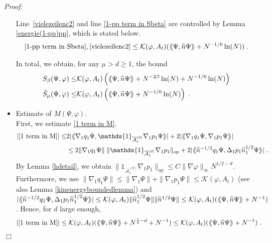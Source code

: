 \documentclass[11pt, english, american]{article}
\newcommand{\laa}{\langle\hspace{-0.08cm}\langle}
\newcommand{\raa}{\rangle\hspace{-0.08cm}\rangle}
\newenvironment{proof}{\emph{Proof:}}{\begin{flushright} $ \Box $ \end{flushright}}
\renewcommand{\phi}{\varphi}
\begin{document}
\begin{proof}
\begin{itemize}
Line~\eqref{vielezeilenc2} and line \eqref{1-pp term in Sbeta} are controlled by Lemma \ref{energie(1-pp)pp}, which is stated below.
\begin{align*}
\eqref{1-pp term in Sbeta},
\eqref{vielezeilenc2}
\leq
\mathcal{K}(\phi,A_t)( \laa \Psi, \widehat{n} \Psi \raa + N^{-1/6} \ln(N) )
\;.
\end{align*}

In total, we obtain, for any $\mu> d \geq 1$, the bound 
\begin{align*}
S_\beta (\Psi,\phi)
\leq &
\mathcal{K}(\phi,A_t) \left(\laa\Psi,\widehat{n}\Psi\raa+N^{-2\beta } \ln(N) +N^{-1/6 } \ln(N) 
\right)
\\
\tilde{S}_\mu (\Psi,\phi)
 \leq &
\mathcal{K}(\phi,A_t)\left( \laa\Psi,\widehat{n}\Psi\raa+N^{-1/6} \ln(N) \right)
\;.
\end{align*}


\item  Estimate of $M(\Psi, \phi)$.\\
First, we estimate \eqref{1 term in M}.
\begin{align*}
|\eqref{1 term in M}|\leq& 2|\laa\nabla_1q_1\Psi ,
\mathds{1}_{\overline{\mathcal{A}}^{(d)}_{1}}
\nabla_1p_1\Psi \raa|+2|\laa\nabla_1q_1\Psi ,
\nabla_1p_1\Psi \raa|
%
\\&\leq2\|\nabla_1q_1\Psi\|\;\|\mathds{1}_{\overline{\mathcal{A}}^{(d)}_{1}}\nabla_1p_1\|_{\text{op}}
%
+2|\laa\widehat{n}^{-1/2}q_1\Psi ,
\Delta_1 p_1\widehat{n}_{1}^{1/2}\Psi \raa|
\;.
\end{align*}
By Lemma \ref{hdetail}, we obtain 
$\|\mathds{1}_{\overline{\mathcal{A}}^{(d)}_{1}}\nabla_1p_1\|_{\text{op}} \leq 
C 
\| \nabla \phi \|_\infty
N^{1/2-d}$.
Furthermore, we use
$
\| \nabla_1 q_1\Psi\| \leq \| \nabla_1 \Psi\|+\| \nabla_1 p_1\Psi\|\leq \mathcal{K}(\phi, A_t)
$ (see also Lemma \ref{kinenergyboundedlemma}) and
$
|\laa\widehat{n}^{-1/2}q_1\Psi ,
\Delta_1 p_1\widehat{n}_{1}^{1/2}\Psi \raa|
\leq
\mathcal{K}(\phi, A_t)
\|\widehat{n}_{1}^{1/2}\Psi  \|
\|\widehat{n}^{1/2}\Psi  \|
\leq
\mathcal{K}(\phi, A_t)
(
\laa\Psi,\widehat{n}\Psi\raa+ N^{-1}
)
$.
Hence, for $d$ large enough,
\begin{align*}
|\eqref{1 term in M}|&\leq \mathcal{K}(\phi, A_t) (\laa\Psi,\widehat{n}\Psi\raa+N^{\frac{1}{2} -d} + N^{-1})
\leq
\mathcal{K}(\phi,A_t) (\laa\Psi,\widehat{n}\Psi\raa+ N^{-1})
\;.
\end{align*}


\end{itemize}
\end{proof}
\end{document}

